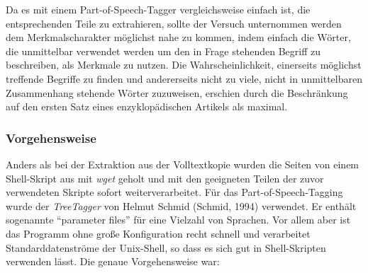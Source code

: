 \documentclass[pagesize,paper=A4,DIV=calc,fontsize=12pt,draft=false]{scrreprt}
\begin{document}
Da es mit einem Part-of-Speech-Tagger vergleichsweise einfach ist, die entsprechenden Teile zu extrahieren, sollte der Versuch unternommen werden dem Merkmalscharakter möglichst nahe zu kommen, indem einfach die Wörter, die unmittelbar verwendet werden um den in Frage stehenden Begriff zu beschreiben, als Merkmale zu nutzen. 
Die Wahrscheinlichkeit, einerseits möglichst treffende Begriffe zu finden und andererseits nicht zu viele, nicht in unmittelbaren Zusammenhang stehende Wörter zuzuweisen, erschien durch die Beschränkung auf den ersten Satz eines enzyklopädischen Artikels als maximal. 

\subsubsection{Vorgehensweise}

Anders als bei der Extraktion aus der Volltextkopie wurden die Seiten von einem Shell-Skript aus mit \emph{wget} geholt und mit den geeigneten Teilen der zuvor verwendeten Skripte sofort weiterverarbeitet. 
Für das Part-of-Speech-Tagging wurde der \emph{TreeTagger} von Helmut Schmid (Schmid, 1994) verwendet.
Er enthält sogenannte \enquote{parameter files} für eine Vielzahl von Sprachen. 
Vor allem aber ist das Programm ohne große Konfiguration recht schnell und verarbeitet Standarddatenströme der Unix-Shell, so dass es sich gut in Shell-Skripten verwenden lässt. 
Die genaue Vorgehensweise war: 
\end{document}
